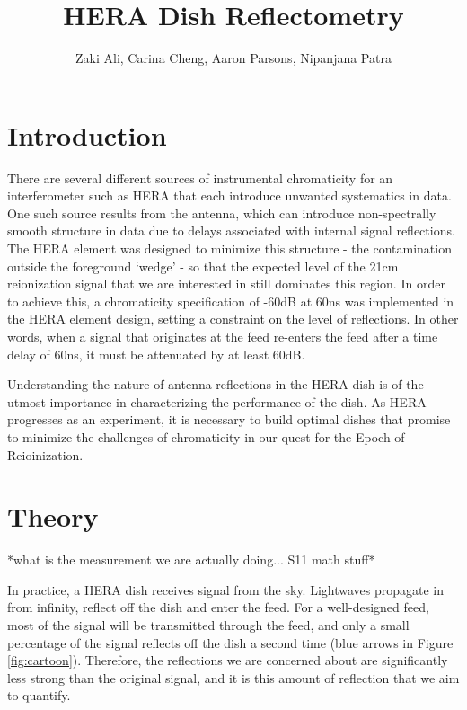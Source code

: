 \documentclass[12pt,preprint]{aastex}
\begin{document}
\title{HERA Dish Reflectometry} 
\author{Zaki Ali, Carina Cheng, Aaron Parsons, Nipanjana Patra}
\maketitle

\section{Introduction}

There are several different sources of instrumental chromaticity for an interferometer such as HERA that each introduce unwanted systematics in data. One such source results from the antenna, which can introduce non-spectrally smooth structure in data due to delays associated with internal signal reflections. The HERA element was designed to minimize this structure - the contamination outside the foreground `wedge' - so that the expected level of the 21cm reionization signal that we are interested in still dominates this region. In order to achieve this, a chromaticity specification of -60dB at 60ns was implemented in the HERA element design, setting a constraint on the level of reflections. In other words, when a signal that originates at the feed re-enters the feed after a time delay of 60ns, it must be attenuated by at least 60dB. 

Understanding the nature of antenna reflections in the HERA dish is of the utmost importance in characterizing the performance of the dish. As HERA progresses as an experiment, it is necessary to build optimal dishes that promise to minimize the challenges of chromaticity in our quest for the Epoch of Reioinization.

\section{Theory}{\label{sec:theory}}

*what is the measurement we are actually doing... S11 math stuff* 

In practice, a HERA dish receives signal from the sky. Lightwaves propagate in from infinity, reflect off the dish and enter the feed. For a well-designed feed, most of the signal will be transmitted through the feed, and only a small percentage of the signal reflects off the dish a second time (blue arrows in Figure \ref{fig:cartoon}). Therefore, the reflections we are concerned about are significantly less strong than the original signal, and it is this amount of reflection that we aim to quantify.
\end{document}
